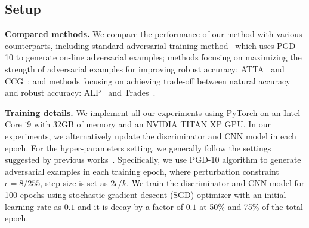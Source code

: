 \documentclass[10pt,twocolumn,letterpaper]{article}
\begin{document}
\subsection{Setup}
\noindent\textbf{Compared methods.} We compare the performance of our method with various counterparts, including standard adversarial training method~\cite{madry2018towards} which uses PGD-10 to generate on-line adversarial examples; methods focusing on maximizing the strength of adversarial examples for improving robust accuracy: ATTA~\cite{zheng2020efficient} and CCG~\cite{tack2021consistency}; and methods focusing on achieving trade-off between natural accuracy and robust accuracy:  ALP~\cite{58kannan2018adversarial} and Trades~\cite{Zhang2019tradeoff}. %
\vspace{5pt}

\noindent\textbf{Training details.}
We implement all our experiments using PyTorch on an Intel Core i9 with 32GB of memory and an NVIDIA TITAN XP GPU. In our experiments, we alternatively update the discriminator and CNN model in each epoch. For the hyper-parameters setting, we generally follow the settings suggested by previous works~\cite{cui2020learnable,Zhang2019tradeoff}. Specifically, we use PGD-10 algorithm to generate adversarial examples in each training epoch, where perturbation constraint $\epsilon=8/255$, step size is set as $2\epsilon/k$. We train the discriminator and CNN model for 100 epochs using stochastic gradient descent (SGD) optimizer with an initial learning rate as $0.1$ and it is decay by a factor of $0.1$ at 50\% and 75\% of the total epoch. 
\end{document}
